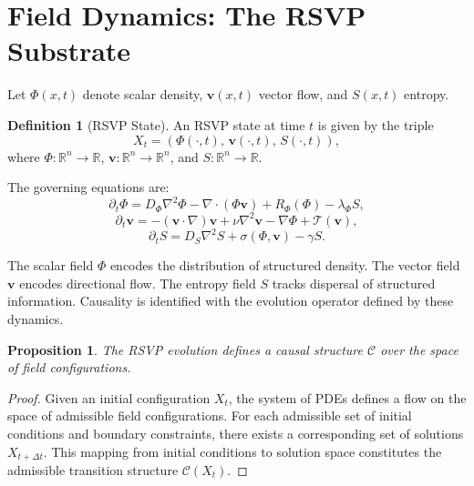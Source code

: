 \documentclass[11pt,a4paper]{article}
\newtheorem{proposition}[theorem]{Proposition}
\theoremstyle{definition}
\newtheorem{definition}[theorem]{Definition}
\theoremstyle{remark}
\begin{document}
\section{Field Dynamics: The RSVP Substrate}

Let $\Phi(x,t)$ denote scalar density, $\mathbf{v}(x,t)$ vector flow, and $S(x,t)$ entropy.

\begin{definition}[RSVP State]
An RSVP state at time $t$ is given by the triple
\[
X_t = (\Phi(\cdot,t),\, \mathbf{v}(\cdot,t),\, S(\cdot,t)),
\]
where $\Phi : \mathbb{R}^n \to \mathbb{R}$, $\mathbf{v} : \mathbb{R}^n \to \mathbb{R}^n$, and $S : \mathbb{R}^n \to \mathbb{R}$.
\end{definition}

The governing equations are:
\begin{equation}
\partial_t \Phi = D_\Phi \nabla^2 \Phi - \nabla \cdot (\Phi \mathbf{v}) + R_\Phi(\Phi) - \lambda_\Phi S,
\end{equation}
\begin{equation}
\partial_t \mathbf{v} = -(\mathbf{v} \cdot \nabla)\mathbf{v} + \nu \nabla^2 \mathbf{v} - \nabla \Phi + \mathcal{T}(\mathbf{v}),
\end{equation}
\begin{equation}
\partial_t S = D_S \nabla^2 S + \sigma(\Phi, \mathbf{v}) - \gamma S.
\end{equation}

The scalar field $\Phi$ encodes the distribution of structured density. The vector field $\mathbf{v}$ encodes directional flow. The entropy field $S$ tracks dispersal of structured information. Causality is identified with the evolution operator defined by these dynamics.

\begin{proposition}
The RSVP evolution defines a causal structure $\mathcal{C}$ over the space of field configurations.
\end{proposition}

\begin{proof}
Given an initial configuration $X_t$, the system of PDEs defines a flow on the space of admissible field configurations. For each admissible set of initial conditions and boundary constraints, there exists a corresponding set of solutions $X_{t+\Delta t}$. This mapping from initial conditions to solution space constitutes the admissible transition structure $\mathcal{C}(X_t)$.
\end{proof}
\end{document}
